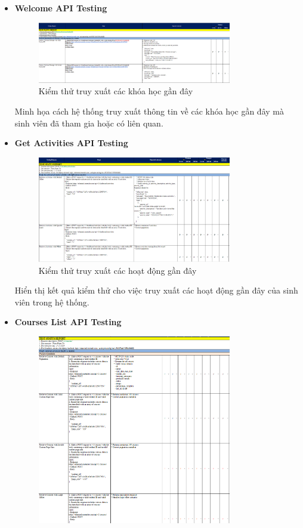 \begin{itemize}
    \item \textbf{Welcome API Testing}
    \begin{figure}[H]
        \centering
        \includegraphics[width=0.8\textwidth]{Images/test/test_WC.png}
        \caption{Kiểm thử truy xuất các khóa học gần đây}
    \end{figure}
    Minh họa cách hệ thống truy xuất thông tin về các khóa học gần đây mà sinh viên đã tham gia hoặc có liên quan.
    \item \textbf{Get Activities API Testing}
    \begin{figure}[H]
        \centering
        \includegraphics[width=0.8\textwidth]{Images/test/test_GA.png}
        \caption{Kiểm thử truy xuất các hoạt động gần đây}
    \end{figure}
    Hiển thị kết quả kiểm thử cho việc truy xuất các hoạt động gần đây của sinh viên trong hệ thống.
    \item \textbf{Courses List API Testing}
    \begin{figure}[H]
        \centering
        \includegraphics[width=0.8\textwidth]{Images/test/test_CL.png}

\end{figure}
\end{itemize}
